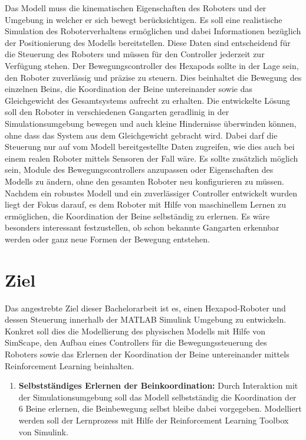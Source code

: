 Das Modell muss die kinematischen Eigenschaften des Roboters und der Umgebung in welcher er sich bewegt berücksichtigen.
Es soll eine realistische Simulation des Roboterverhaltens ermöglichen und dabei Informationen bezüglich der Positionierung des Modells bereitstellen.
Diese Daten sind entscheidend für die Steuerung des Roboters und müssen für den Controller jederzeit zur Verfügung stehen.
Der Bewegungscontroller des Hexapods sollte in der Lage sein, den Roboter zuverlässig und präzise zu steuern.
Dies beinhaltet die Bewegung des einzelnen Beins, die Koordination der Beine untereinander sowie das Gleichgewicht des Gesamtsystems aufrecht zu erhalten.
Die entwickelte Lösung soll den Roboter in verschiedenen Gangarten geradlinig in der Simulationsumgebung bewegen und auch kleine Hindernisse überwinden können, ohne dass das System aus dem Gleichgewicht gebracht wird.
Dabei darf die Steuerung nur auf vom Modell bereitgestellte Daten zugreifen, wie dies auch bei einem realen Roboter mittels Sensoren der Fall wäre.
Es sollte zusätzlich möglich sein, Module des Bewegungscontrollers anzupassen oder Eigenschaften des Modells zu ändern, ohne den gesamten Roboter neu konfigurieren zu müssen.
Nachdem ein robustes Modell und ein zuverlässiger Controller entwickelt wurden liegt der Fokus darauf, es dem Roboter mit Hilfe von maschinellem Lernen zu ermöglichen, die Koordination der Beine selbständig zu erlernen.
Es wäre besonders interessant festzustellen, ob schon bekannte Gangarten erkennbar werden oder ganz neue Formen der Bewegung entstehen.


\section{Ziel}
Das angestrebte Ziel dieser Bachelorarbeit ist es, einen Hexapod-Roboter und dessen Steuerung innerhalb der MATLAB Simulink Umgebung zu entwickeln.
Konkret soll dies die Modellierung des physischen Modells mit Hilfe von SimScape, den Aufbau eines Controllers für die Bewegungssteuerung des Roboters sowie das Erlernen der Koordination der Beine untereinander mittels Reinforcement Learning beinhalten.

\begin{enumerate}
	
	
	\item \textbf{Selbstständiges Erlernen der Beinkoordination:} Durch Interaktion mit der Simulationsumgebung soll das Modell selbstständig die Koordination der 6 Beine erlernen, die Beinbewegung selbst bleibe dabei vorgegeben.
	Modelliert werden soll der Lernprozess mit Hilfe der Reinforcement Learning Toolbox von Simulink.
	
\end{enumerate}

